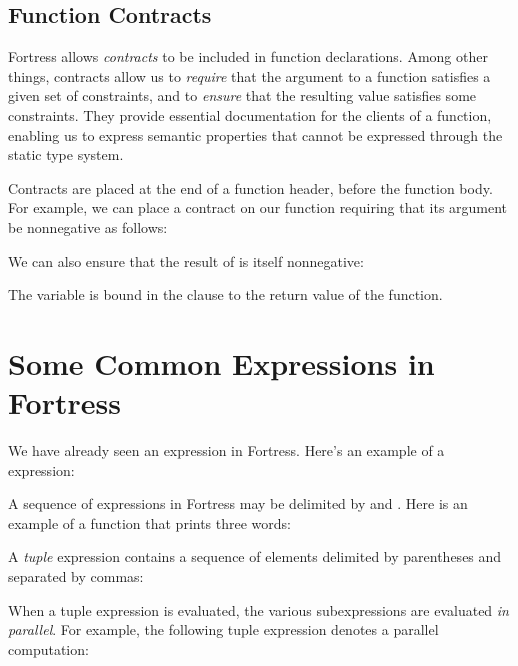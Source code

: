 \subsection{Function Contracts}

Fortress allows \emph{contracts} to be included in function declarations.
Among other things,
contracts allow us to \emph{require}
that the argument to a function satisfies a given set of constraints,
and to \emph{ensure} that the resulting value satisfies some constraints.
They provide essential documentation for the clients of a function,
enabling us to express semantic properties
that cannot be expressed through the static type system.

Contracts are placed at the end of a function header, before the function body.
For example, we can place a contract on our  function requiring
that its argument be nonnegative as follows:


We can also ensure that the result of  is itself nonnegative:


The variable  is bound in the  clause
to the return value of the function.

\section{Some Common Expressions in Fortress}
We have already seen an  expression in Fortress. Here's an
example of a  expression:



A sequence of expressions in Fortress may be delimited by  and
. Here is an example of a function that prints three words:



A \emph{tuple} expression contains a sequence of elements delimited by
parentheses and separated by commas:



When a tuple expression is evaluated, the various subexpressions are
evaluated \emph{in parallel}. For example, the following tuple
expression
denotes a parallel computation:



